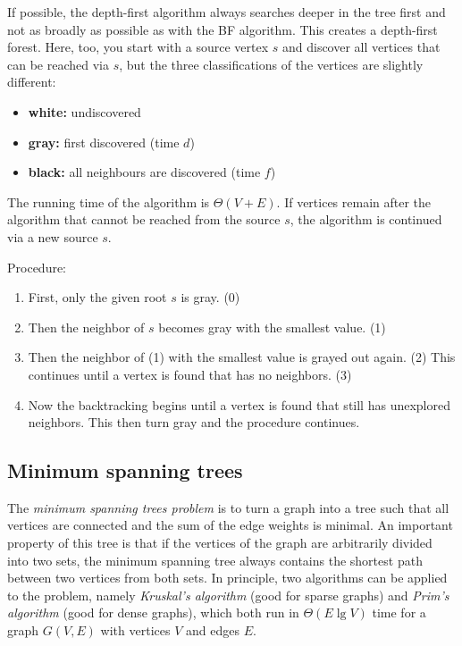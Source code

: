 If possible, the depth-first algorithm always searches deeper in the tree first and not as broadly as possible as with the BF algorithm. This creates a depth-first forest. Here, too, you start with a source vertex $s$ and discover all vertices that can be reached via $s$, but the three classifications of the vertices are slightly different:

\begin{itemize}
    \item \textbf{white:} undiscovered
    \item \textbf{gray:} first discovered (time $d$)
    \item \textbf{black:} all neighbours are discovered (time $f$)
\end{itemize}

The running time of the algorithm is $\Theta(V+E)$. If vertices remain after the algorithm that cannot be reached from the source $s$, the algorithm is continued via a new source $s$.

Procedure:
\begin{enumerate}
    \item First, only the given root $s$ is gray. (0)
    \item Then the neighbor of $s$ becomes gray with the smallest value. (1)
    \item Then the neighbor of (1) with the smallest value is grayed out again. (2) This continues until a vertex is found that has no neighbors. (3)
    \item Now the backtracking begins until a vertex is found that still has unexplored neighbors. This then turn gray and the procedure continues.
\end{enumerate}

%

\subsection{Minimum spanning trees}

The \emph{minimum spanning trees problem} is to turn a graph into a tree such that all vertices are connected and the sum of the edge weights is minimal. An important property of this tree is that if the vertices of the graph are arbitrarily divided into two sets, the minimum spanning tree always contains the shortest path between two vertices from both sets. In principle, two algorithms can be applied to the problem, namely \emph{Kruskal's algorithm} (good for sparse graphs) and \emph{Prim's algorithm} (good for dense graphs), which both run in $\Theta(E\lg V)$ time for a graph $G(V,E)$ with vertices $V$ and edges $E$.

